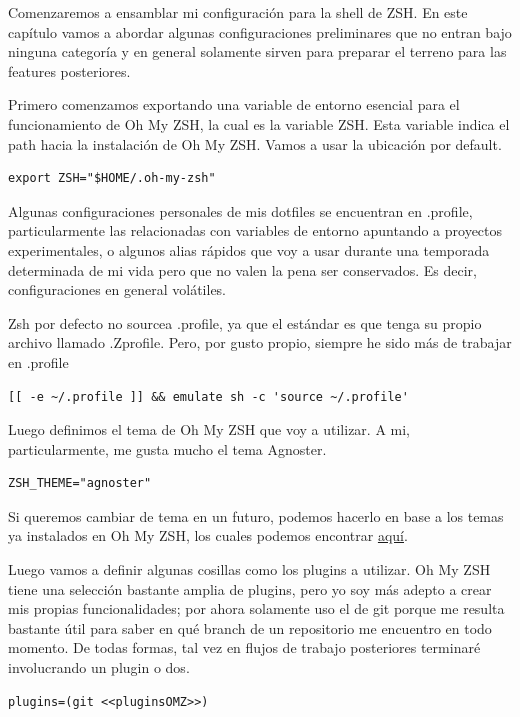 \documentclass[11pt]{article}
\begin{document}
Comenzaremos a ensamblar mi configuración para la shell de ZSH. En este capítulo vamos a abordar algunas configuraciones preliminares que no entran bajo ninguna categoría y en general solamente sirven para preparar el terreno para las features posteriores.

Primero comenzamos exportando una variable de entorno esencial para el funcionamiento de Oh My ZSH, la cual es la variable ZSH. Esta variable indica el path hacia la instalación de Oh My ZSH. Vamos a usar la ubicación por default.

\begin{verbatim}
export ZSH="$HOME/.oh-my-zsh"
\end{verbatim}

Algunas configuraciones personales de mis dotfiles se encuentran en .profile, particularmente las relacionadas con variables de entorno apuntando a proyectos experimentales, o algunos alias rápidos que voy a usar durante una temporada determinada de mi vida pero que no valen la pena ser conservados. Es decir, configuraciones en general volátiles.

Zsh por defecto no sourcea .profile, ya que el estándar es que tenga su propio archivo llamado .Zprofile. Pero, por gusto propio, siempre he sido más de trabajar en .profile

\begin{verbatim}
[[ -e ~/.profile ]] && emulate sh -c 'source ~/.profile'
\end{verbatim}

Luego definimos el tema de Oh My ZSH que voy a utilizar. A mi, particularmente, me gusta mucho el tema Agnoster.

\begin{verbatim}
ZSH_THEME="agnoster"
\end{verbatim}

Si queremos cambiar de tema en un futuro, podemos hacerlo en base a los temas ya instalados en Oh My ZSH, los cuales podemos encontrar \href{https://github.com/ohmyzsh/ohmyzsh/wiki/Themes}{aquí}.

Luego vamos a definir algunas cosillas como los plugins a utilizar. Oh My ZSH tiene una selección bastante amplia de plugins, pero yo soy más adepto a crear mis propias funcionalidades; por ahora solamente uso el de git porque me resulta bastante útil para saber en qué branch de un repositorio me encuentro en todo momento. De todas formas, tal vez en flujos de trabajo posteriores terminaré involucrando un plugin o dos.

\begin{verbatim}
plugins=(git <<pluginsOMZ>>)
\end{verbatim}
\end{document}
